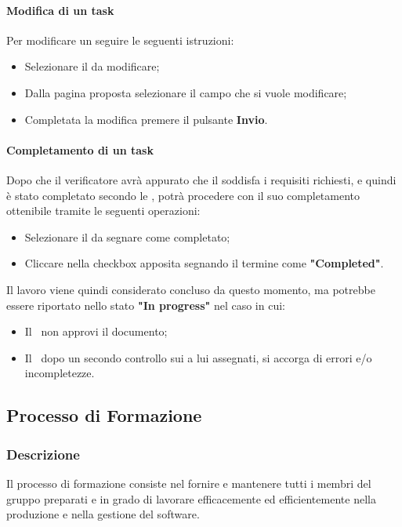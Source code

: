 \paragraph{Modifica di un task}
Per modificare un  seguire le seguenti istruzioni:
\begin{itemize}
  \item Selezionare il  da modificare;
  \item Dalla pagina proposta selezionare il campo che si vuole modificare;
  \item Completata la modifica premere il pulsante \textbf{Invio}.
\end{itemize}

\paragraph{Completamento di un task}
Dopo che il verificatore avrà appurato che il  soddisfa i requisiti richiesti, e quindi è stato completato secondo le \NdP, potrà procedere con il suo completamento ottenibile tramite le seguenti operazioni:
\begin{itemize}
  \item Selezionare il  da segnare come completato;
  \item Cliccare nella checkbox apposita segnando il termine come \textbf{"Completed"}.
\end{itemize}
Il lavoro viene quindi considerato concluso da questo momento, ma potrebbe essere riportato nello stato \textbf{"In progress"} nel caso in cui:
\begin{itemize}
  \item Il \Pm\ non approvi il documento;
  \item Il \Ver\, dopo un secondo controllo sui  a lui assegnati, si accorga di errori e/o incompletezze. 
\end{itemize}

\subsection{Processo di Formazione}
\subsubsection{Descrizione}
Il processo di formazione consiste nel fornire e mantenere tutti i membri del gruppo preparati e in grado di lavorare efficacemente ed efficientemente nella produzione e nella gestione del software.

